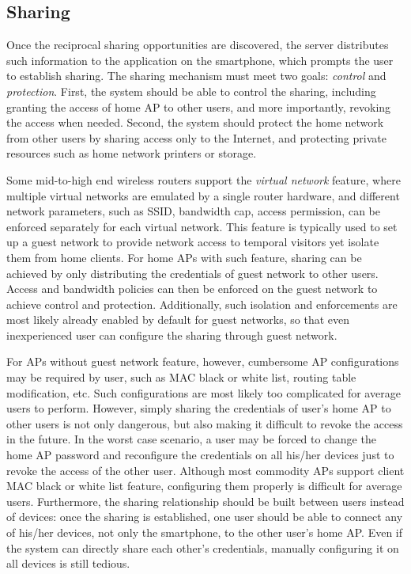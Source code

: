 \subsection{Sharing}
\label{subsec:sharing}

Once the reciprocal sharing opportunities are discovered, the \wisefi{} server
distributes such information to the \wisefi{} application on the smartphone, which
prompts the user to establish \wifi{} sharing. The sharing mechanism must meet two
goals: \textit{control} and \textit{protection}. First, the system should be
able to control the sharing, including granting the access of home AP to other
\wisefi{} users, and more importantly, revoking the access when needed. Second,
the system should protect the home network from other \wisefi{} users by sharing
access only to the Internet, and protecting private resources such as home
network printers or storage.

Some mid-to-high end wireless routers support the \textit{virtual network}
feature, where multiple virtual \wifi{} networks are emulated by a single router
hardware, and different network parameters, such as SSID, bandwidth cap, access
permission, can be enforced separately for each virtual network. This feature is
typically used to set up a guest \wifi{} network to provide network access to
temporal visitors yet isolate them from home clients. For home APs with such
feature, \wifi{} sharing can be achieved by only distributing the credentials of
guest network to other \wisefi{} users. Access and bandwidth policies can then
be enforced on the guest network to achieve control and protection.
Additionally, such isolation and enforcements are most likely already enabled
by default for guest networks, so that even inexperienced user can configure the
\wifi{} sharing through guest network.

For APs without guest network feature, however, cumbersome AP configurations may
be required by user, such as MAC black or white list, routing table
modification, etc. Such configurations are most likely too complicated for
average users to perform. However, simply sharing the \wifi{} credentials of user's
home AP to other \wisefi{} users is not only dangerous, but also making it
difficult to revoke the access in the future. In the worst case scenario, a user may
be forced to change the home AP password and reconfigure the \wifi{} credentials
on all his/her devices just to revoke the access of the other \wisefi{} user.
Although most commodity APs support client MAC black or white list feature,
configuring them properly is difficult for average users. Furthermore, the
sharing relationship should be built between users instead of devices: once the
sharing is established, one user should be able to connect any of his/her
devices, not only the smartphone, to the other user's home AP. Even if the system
can directly share each other's \wifi{} credentials, manually configuring it on
all devices is still tedious.


